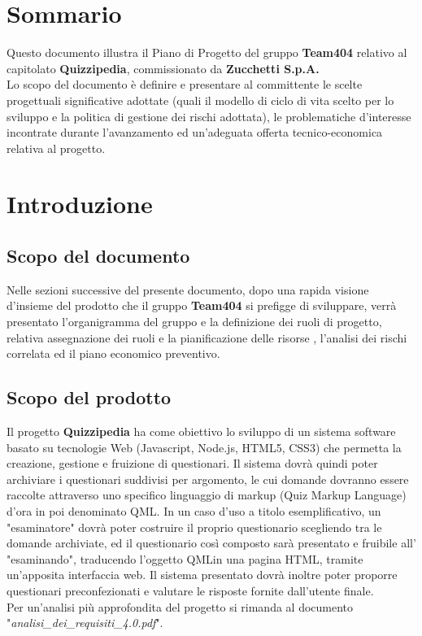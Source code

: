 \documentclass[a4paper,11pt]{article}
\begin{document}
	\newpage
	\tableofcontents
	
	\newpage
	\listoftables
	\listoffigures	
	
	\newpage
	\section{Sommario}
	Questo documento illustra il Piano di Progetto del gruppo \textbf{Team404} relativo al capitolato \textbf{Quizzipedia}, commissionato da \textbf{Zucchetti S.p.A.}
	\\
	Lo scopo del documento è definire e presentare al committente le scelte progettuali significative adottate (quali il modello di ciclo di vita scelto per lo sviluppo e la politica di gestione dei rischi adottata), le problematiche d'interesse incontrate durante l'avanzamento ed un'adeguata offerta tecnico-economica relativa al progetto.
	
	\newpage
	\section{Introduzione}
	\subsection{Scopo del documento}
	Nelle sezioni successive del presente documento, dopo una rapida visione d'insieme del prodotto che il gruppo \textbf{Team404} si prefigge di sviluppare, verrà presentato l'organigramma del gruppo e la definizione dei ruoli di progetto, relativa assegnazione dei ruoli e la pianificazione delle risorse , l'analisi dei rischi correlata ed il piano economico preventivo.
	\subsection{Scopo del prodotto}
	Il progetto \textbf{Quizzipedia} ha come obiettivo lo sviluppo di un sistema software basato su tecnologie Web (Javascript\addglos, Node.js\addglos, HTML5\addglos, CSS3\addglos) che permetta la creazione, gestione e fruizione di questionari. Il sistema dovrà quindi poter archiviare i questionari suddivisi per argomento, le cui domande dovranno essere raccolte attraverso uno specifico linguaggio di markup (Quiz Markup Language) d'ora in poi denominato QML\addglos. In un caso d'uso a titolo esemplificativo, un "esaminatore" dovrà poter costruire il proprio questionario scegliendo tra le domande archiviate, ed il questionario così composto sarà presentato e fruibile all' "esaminando", traducendo l'oggetto QML\addglos in una pagina HTML\addglos, tramite un'apposita interfaccia web. Il sistema presentato dovrà inoltre poter proporre questionari preconfezionati e valutare le risposte fornite dall'utente finale.
	\\
	Per un'analisi più approfondita del progetto si rimanda al documento "\textit{analisi\_dei\_requisiti\_4.0.pdf}".
\end{document}
